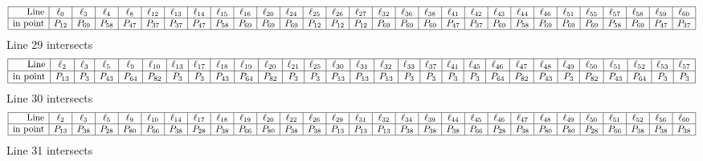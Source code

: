 \documentclass{article}
\begin{document}
{$$
\begin{array}{|r*{28}{|c}|}
\hline
\mbox{Line}  & \ell_{0} & \ell_{3} & \ell_{4} & \ell_{8} & \ell_{12} & \ell_{13} & \ell_{14} & \ell_{15} & \ell_{16} & \ell_{20} & \ell_{24} & \ell_{25} & \ell_{26} & \ell_{27} & \ell_{32} & \ell_{36} & \ell_{38} & \ell_{41} & \ell_{42} & \ell_{43} & \ell_{44} & \ell_{46} & \ell_{51} & \ell_{55} & \ell_{57} & \ell_{58} & \ell_{59} & \ell_{60}\\
\hline
\mbox{in point}  & P_{12} & P_{69} & P_{58} & P_{47} & P_{37} & P_{37} & P_{47} & P_{58} & P_{69} & P_{69} & P_{69} & P_{12} & P_{12} & P_{12} & P_{69} & P_{69} & P_{69} & P_{47} & P_{37} & P_{69} & P_{58} & P_{69} & P_{69} & P_{69} & P_{58} & P_{69} & P_{47} & P_{37}\\
\hline
\end{array}
$$
Line 29 intersects 
$$
\begin{array}{|r*{28}{|c}|}
\hline
\mbox{Line}  & \ell_{2} & \ell_{3} & \ell_{5} & \ell_{9} & \ell_{10} & \ell_{13} & \ell_{17} & \ell_{18} & \ell_{19} & \ell_{20} & \ell_{21} & \ell_{25} & \ell_{30} & \ell_{31} & \ell_{32} & \ell_{33} & \ell_{37} & \ell_{41} & \ell_{45} & \ell_{46} & \ell_{47} & \ell_{48} & \ell_{49} & \ell_{50} & \ell_{51} & \ell_{52} & \ell_{53} & \ell_{57}\\
\hline
\mbox{in point}  & P_{13} & P_{3} & P_{43} & P_{64} & P_{82} & P_{3} & P_{3} & P_{43} & P_{64} & P_{82} & P_{3} & P_{3} & P_{13} & P_{13} & P_{13} & P_{3} & P_{3} & P_{3} & P_{3} & P_{64} & P_{82} & P_{43} & P_{3} & P_{82} & P_{43} & P_{64} & P_{3} & P_{3}\\
\hline
\end{array}
$$
Line 30 intersects 
$$
\begin{array}{|r*{28}{|c}|}
\hline
\mbox{Line}  & \ell_{2} & \ell_{3} & \ell_{5} & \ell_{9} & \ell_{10} & \ell_{14} & \ell_{17} & \ell_{18} & \ell_{19} & \ell_{20} & \ell_{22} & \ell_{26} & \ell_{29} & \ell_{31} & \ell_{32} & \ell_{34} & \ell_{39} & \ell_{44} & \ell_{45} & \ell_{46} & \ell_{47} & \ell_{48} & \ell_{49} & \ell_{50} & \ell_{51} & \ell_{52} & \ell_{56} & \ell_{60}\\
\hline
\mbox{in point}  & P_{13} & P_{38} & P_{28} & P_{80} & P_{66} & P_{38} & P_{28} & P_{38} & P_{66} & P_{80} & P_{38} & P_{38} & P_{13} & P_{13} & P_{13} & P_{38} & P_{38} & P_{38} & P_{66} & P_{28} & P_{38} & P_{80} & P_{80} & P_{28} & P_{66} & P_{38} & P_{38} & P_{38}\\
\hline
\end{array}
$$
Line 31 intersects 
$$
\begin{array}{|r*{28}{|c}|}

\end{array}$$}
\end{document}
